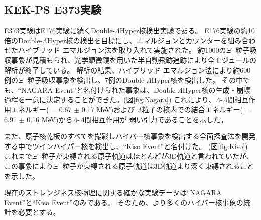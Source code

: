 \documentclass[12pt,a4paper]{jarticle}
\begin{document}
\subsection{KEK-PS E373実験}
E373実験はE176実験に続くDouble-$\Lambda$Hyper核検出実験である。
\cite{Nagara}
\cite{Nagara2}
E176実験の約10倍のDouble-$\Lambda$Hyper核の検出を目標にし、エマルジョンとカウンターを組み合わせたハイブリッド-エマルジョン法を取り入れて実施された。
約1000の$\Xi$$^-$粒子吸収事象が見積もられ、光学顕微鏡を用いた半自動飛跡追跡により全モジュールの解析が終了している。
解析の結果、ハイブリッド-エマルジョン法により約600例の$\Xi$$^-$粒子吸収事象を検出し、7例のDouble-$\Lambda$Hyper核を検出した。
その中でも、“NAGARA Event”と名付けられた事象は、Double-$\Lambda$Hyper核の生成・崩壊過程を一意に決定することができた。(図\ref{fig:Nagara})
これにより、$\Lambda$-$\Lambda$間相互作用エネルギー( = 0.67 $\pm$ 0.17 MeV)および
$\Lambda$粒子の核内での結合エネルギー( = 6.91 $\pm$ 0.16 MeV)から$\Lambda$-$\Lambda$間相互作用が
弱い引力であることを示した。
\par
また、原子核乾板のすべてを撮影しハイパー核事象を検出する全面探査法を開発する中でツインハイパー核を検出し、“Kiso Event”と名付けた。
(図\ref{fig:Kiso})
これまで$\Xi$$^-$粒子が束縛される原子軌道はほとんどが3D軌道と言われていたが、
この事象により$\Xi$$^-$粒子が束縛される原子軌道は3D軌道より深く束縛されることを示した。
\par
現在のストレンジネス核物理に関する確かな実験データは“NAGARA Event”と“Kiso Event”のみである。
そのため、より多くのハイパー核事象の統計を必要とする。
\end{document}
